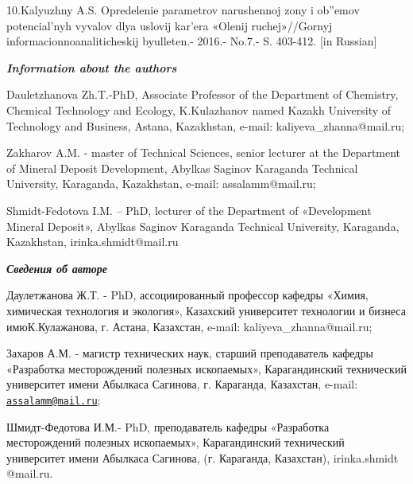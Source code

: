 10.Kalyuzhny A.S. Opredelenie parametrov narushennoj zony i ob''emov
potencial'nyh vyvalov dlya uslovij kar'era «Olenij ruchej»//Gornyj
informacionnoanaliticheskij byulleten.- 2016.- No.7.- S. 403-412. {[}in
Russian{]}

\emph{{\bfseries Information about the authors}}

Dauletzhanova Zh.T.-PhD, Associate Professor of the Department of
Chemistry, Chemical Technology and Ecology, K.Kulazhanov named Kazakh
University of Technology and Business, Astana, Kazakhstan, e-mail:
kaliyeva\_zhanna@mail.ru;

Zakharov A.M. - master of Technical Sciences, senior lecturer at the
Department of Mineral Deposit Development, Abylkas Saginov Karaganda
Technical University, Karaganda, Kazakhstan, e-mail: assalamm@mail.ru;

Shmidt-Fedotova I.M. -- PhD, lecturer of the Department of «Development
Mineral Deposit», Abylkas Saginov Karaganda Technical University,
Karaganda, Kazakhstan, irinka.shmidt@mail.ru

\emph{{\bfseries Сведения об авторе}}

Даулетжанова Ж.Т. - PhD, ассоциированный профессор кафедры «Химия,
химическая технология и экология», Казахский университет технологии и
бизнеса имюК.Кулажанова, г. Астана, Казахстан, e-mail:
kaliyeva\_zhanna@mail.ru;

Захаров А.М. - магистр технических наук, старший преподаватель кафедры
«Разработка месторождений полезных ископаемых», Карагандинский
технический университет имени Абылкаса Сагинова, г. Караганда,
Казахстан, e-mail:
\href{mailto:assalamm@mail.ru}{\nolinkurl{assalamm@mail.ru}};

Шмидт-Федотова И.М.- PhD, преподаватель кафедры «Разработка
месторождений полезных ископаемых», Карагандинский технический
университет имени Абылкаса Сагинова, (г. Караганда, Казахстан),
irinka.shmidt @mail.ru.